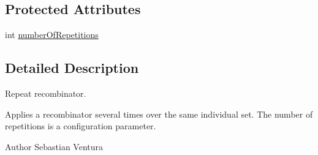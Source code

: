 \subsection*{Protected Attributes}
\begin{DoxyCompactItemize}
\item 
int \hyperlink{classnet_1_1sf_1_1jclec_1_1base_1_1_repeat_recombinator_a045a86444b6cb91ac1fdecba2cb0a2c0}{number\-Of\-Repetitions}
\end{DoxyCompactItemize}


\subsection{Detailed Description}
Repeat recombinator.

Applies a recombinator several times over the same individual set. The number of repetitions is a configuration parameter.

\begin{DoxyAuthor}{Author}
Sebastian Ventura 
\end{DoxyAuthor}


